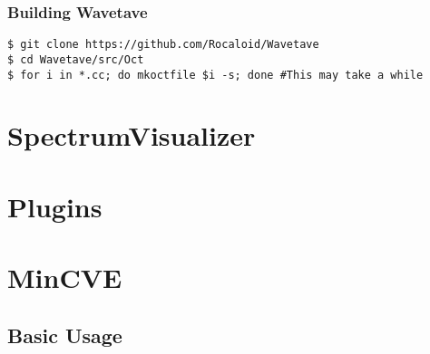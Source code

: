         \subsubsection{Building Wavetave}\indent
        
        \lstset{language = bash, tabsize = 4}
        
        \begin{lstlisting}
$ git clone https://github.com/Rocaloid/Wavetave
$ cd Wavetave/src/Oct
$ for i in *.cc; do mkoctfile $i -s; done #This may take a while
        \end{lstlisting}

\section{SpectrumVisualizer}
        
        
        
\section{Plugins}

        

\section{MinCVE}

\subsection{Basic Usage}


